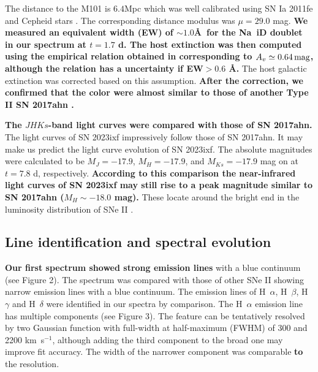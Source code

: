\documentclass{pasj01}
\begin{document}
The distance to the M101 is $6.4$Mpc which was 
well calibrated 
using SN Ia 2011fe \citep{Matheson2012} 
and Cepheid stars \citep{Macri2001,Shappee2011}. 
The corresponding distance modulus was $\mu=29.0$ mag.
{\bf We measured an equivalent width (EW) of $\sim1.0$\AA\ for the Na~{\sc i}D doublet in our spectrum at $t=1.7$ d. The host extinction was then computed using the empirical relation obtained in \citet{Poznanski2012} 
corresponding to $A_v\simeq0.64\,\rm{mag}$, although the relation
has a uncertainty if EW$>0.6$ \AA.}
The host galactic extinction was corrected based on this assumption.
{\bf After the correction, we confirmed that 
the color were almost similar to those of 
another Type II SN 2017ahn \citep{Tartagrlia2021}.}

{\bf The $JHKs$-band light curves  were compared with those of SN 2017ahn.}
The light curves of SN 2023ixf impressively follow those of 
SN 2017ahn. It may make us predict the light curve evolution of SN 2023ixf.
The absolute magnitudes were calculated to be 
$M_{J}=-17.9$, $M_{H}=-17.9$, and $M_{Ks}=-17.9$
mag on at $t=7.8$ d, respectively. 
{\bf According to this comparison the near-infrared light curves of SN 2023ixf may still rise to a peak magnitude similar to SN 2017ahn ($M_{H}\sim-18.0$ mag).}
These locate around the bright end in the luminosity 
distribution of SNe II \citep{Anderson2014}.




\subsection{Line identification and spectral evolution}

 {\bf Our first spectrum showed strong emission lines} with 
a blue continuum (see Figure 2). The spectrum was compared 
with those of other SNe II showing narrow emission lines 
with a blue continuum. The emission lines of 
H~$\alpha$, H~$\beta$, H~$\gamma$ and H~$\delta$ were identified 
in our spectra by comparison.
The H~$\alpha$ emission line has multiple components (see Figure 3).  
The feature can be tentatively resolved by 
two Gaussian function with full-width at half-maximum (FWHM)
of 300 and 2200 km~s$^{-1}$, although adding 
the third component 
to the broad one may improve fit accuracy. The width of the 
narrower component was comparable {\bf to} the resolution.
\end{document}
